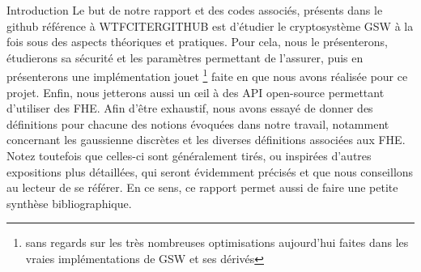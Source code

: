 \begin{section}{Introduction}
Le but de notre rapport et des codes associés, présents dans le github référence à WTFCITERGITHUB est d'étudier 
le cryptosystème GSW à la fois sous des aspects théoriques et pratiques. 
Pour cela, nous le présenterons, étudierons sa sécurité et les paramètres permettant de l'assurer, puis en présenterons une implémentation jouet
\footnote{sans regards sur les très nombreuses optimisations aujourd'hui faites dans les vraies implémentations
de GSW et ses dérivés} faite en  que nous avons réalisée pour ce projet.
Enfin, nous jetterons aussi un \oe{}il à des API open-source permettant d'utiliser des FHE.
Afin d'être exhaustif, nous avons essayé de donner des définitions pour chacune des notions évoquées dans notre travail,
notamment concernant les gaussienne discrètes et les diverses définitions associées aux FHE. Notez toutefois que 
celles-ci sont généralement tirés, ou inspirées d'autres expositions plus détaillées, qui seront évidemment précisés
et que nous conseillons au lecteur de se référer. En ce sens, ce rapport permet aussi de faire une petite synthèse 
bibliographique.
\end{section}
